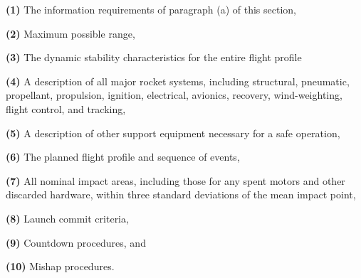 \begin{adjustwidth}{0.5in}{0.0in}
\textbf{(1)} The information requirements of paragraph (a) of this section,\par

\end{adjustwidth}

\begin{adjustwidth}{0.5in}{0.0in}
\textbf{(2)} Maximum possible range,\par

\end{adjustwidth}

\begin{adjustwidth}{0.5in}{0.0in}
\textbf{(3)} The dynamic stability characteristics for the entire flight profile\par

\end{adjustwidth}

\begin{adjustwidth}{0.5in}{0.0in}
\textbf{(4)} A description of all major rocket systems, including structural, pneumatic, propellant, propulsion, ignition, electrical, avionics, recovery, wind-weighting, flight control, and tracking,\par

\end{adjustwidth}

\begin{adjustwidth}{0.5in}{0.0in}
\textbf{(5)} A description of other support equipment necessary for a safe operation,\par

\end{adjustwidth}

\begin{adjustwidth}{0.5in}{0.0in}
\textbf{(6)} The planned flight profile and sequence of events,\par

\end{adjustwidth}

\begin{adjustwidth}{0.5in}{0.0in}
\textbf{(7)} All nominal impact areas, including those for any spent motors and other discarded hardware, within three standard deviations of the mean impact point,\par

\end{adjustwidth}

\begin{adjustwidth}{0.5in}{0.0in}
\textbf{(8)} Launch commit criteria,\par

\end{adjustwidth}

\begin{adjustwidth}{0.5in}{0.0in}
\textbf{(9)} Countdown procedures, and\par

\end{adjustwidth}

\begin{adjustwidth}{0.5in}{0.0in}
\textbf{(10)} Mishap procedures.\par

\end{adjustwidth}
